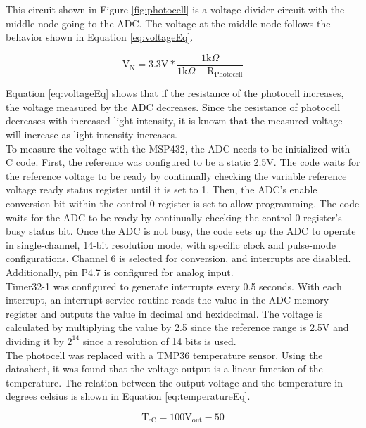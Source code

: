 \documentclass[CMPE]{KGCOEReport}
\begin{document}
This circuit shown in Figure \ref{fig:photocell} is a voltage divider circuit with the middle node going to the ADC. The voltage at the middle node follows the behavior shown in Equation \ref{eq:voltageEq}.

\begin{equation}
\text{V}_\text{N} = 3.3\text{V} * \frac{1\text{k}\Omega}{1\text{k}\Omega + \text{R}_\text{Photocell}} \label{eq:voltageEq}
\end{equation}

Equation \ref{eq:voltageEq} shows that if the resistance of the photocell increases, the voltage measured by the ADC decreases. Since the resistance of photocell decreases with increased light intensity, it is known that the measured voltage will increase as light intensity increases.\\

To measure the voltage with the MSP432, the ADC needs to be initialized with C code. First, the reference was configured to be a static 2.5V. The code waits for the reference voltage to be ready by continually checking the variable reference voltage ready status register until it is set to 1. Then, the ADC's enable conversion bit within the control 0 register is set to allow programming. The code waits for the ADC to be ready by continually checking the control 0 register's busy status bit. Once the ADC is not busy, the code sets up the ADC to operate in single-channel, 14-bit resolution mode, with specific clock and pulse-mode configurations. Channel 6 is selected for conversion, and interrupts are disabled. Additionally, pin P4.7 is configured for analog input.\\

Timer32-1 was configured to generate interrupts every 0.5 seconds. With each interrupt, an interrupt service routine reads the value in the ADC memory register and outputs the value in decimal and hexidecimal. The voltage is calculated by multiplying the value by 2.5 since the reference range is 2.5V and dividing it by $2^{14}$ since a resolution of 14 bits is used. \\

The photocell was replaced with a TMP36 temperature sensor. Using the datasheet, it was found that the voltage output is a linear function of the temperature. The relation between the output voltage and the temperature in degrees celsius is shown in Equation \ref{eq:temperatureEq}.

\begin{equation}
\text{T}_{^\circ\text{C}} = 100\text{V}_\text{out} - 50
\label{eq:temperatureEq}
\end{equation}
\end{document}
